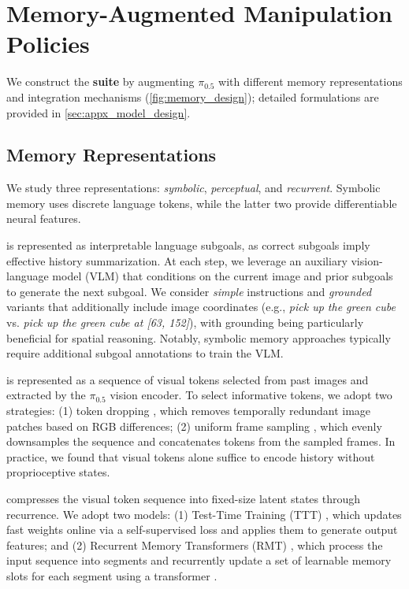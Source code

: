 \section{Memory-Augmented Manipulation Policies}
\label{sec:method}

We construct the \textbf{\modelname\xspace suite} by augmenting $\pi_{0.5}$ with different memory representations and integration mechanisms (\cref{fig:memory_design}); detailed formulations are provided in \cref{sec:appx_model_design}.

\subsection{Memory Representations}

We study three representations: \textit{symbolic}, \textit{perceptual}, and \textit{recurrent}.
Symbolic memory uses discrete language tokens, while the latter two provide differentiable neural features.

 is represented as interpretable language subgoals, as correct subgoals imply effective history summarization. At each step, we leverage an auxiliary vision-language model (VLM) that conditions on the current image and prior subgoals to generate the next subgoal. We consider \emph{simple} instructions and \emph{grounded} variants that additionally include image coordinates (e.g., \textit{pick up the green cube} vs. \textit{pick up the green cube at [63, 152]}), with grounding being particularly beneficial for spatial reasoning. Notably, symbolic memory approaches typically require additional subgoal annotations to train the VLM.

 is represented as a sequence of visual tokens selected from past images and  extracted by the $\pi_{0.5}$ vision encoder. To select informative tokens, we adopt two strategies: (1) token dropping \cite{yao2025timechat}, which removes temporally redundant image patches based on RGB differences; (2) uniform frame sampling \cite{chen2024videollm}, which evenly downsamples the sequence and concatenates tokens from the sampled frames. In practice, we found that visual tokens alone suffice to encode history without proprioceptive states.

 compresses the visual token sequence into fixed-size latent states through recurrence. We adopt two models: (1) Test-Time Training (TTT) \cite{sun2024learning, zhang2025test}, which updates fast weights online via a self-supervised loss and applies them to generate output features; and (2) Recurrent Memory Transformers (RMT) \cite{bulatov2022recurrent, bulatov2023scaling}, which process the input sequence into segments and recurrently update a set of learnable memory slots for each segment using a transformer \cite{vaswani2017attention}.


